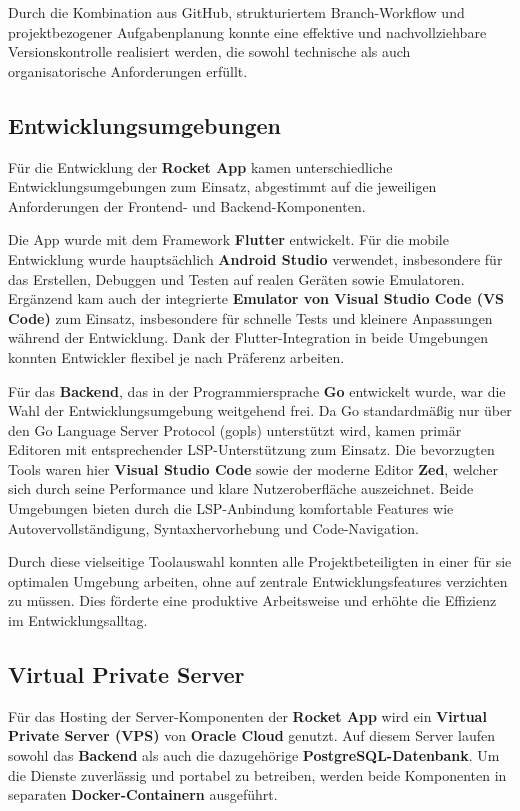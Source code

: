 \documentclass[11pt,a4paper]{article}
\begin{document}
Durch die Kombination aus GitHub, strukturiertem Branch-Workflow und projektbezogener Aufgabenplanung konnte eine effektive und nachvollziehbare Versionskontrolle realisiert werden, die sowohl technische als auch organisatorische Anforderungen erfüllt.

\subsection{Entwicklungsumgebungen}

Für die Entwicklung der \textbf{Rocket App} kamen unterschiedliche Entwicklungsumgebungen zum Einsatz, abgestimmt auf die jeweiligen Anforderungen der Frontend- und Backend-Komponenten.

Die App wurde mit dem Framework \textbf{Flutter}\cite{flutter} entwickelt. Für die mobile Entwicklung wurde hauptsächlich \textbf{Android Studio}\cite{androidstudio} verwendet, insbesondere für das Erstellen, Debuggen und Testen auf realen Geräten sowie Emulatoren. Ergänzend kam auch der integrierte \textbf{Emulator von Visual Studio Code (VS Code)}\cite{VSCode} zum Einsatz, insbesondere für schnelle Tests und kleinere Anpassungen während der Entwicklung. Dank der Flutter-Integration in beide Umgebungen konnten Entwickler flexibel je nach Präferenz arbeiten.

Für das \textbf{Backend}, das in der Programmiersprache \textbf{Go}\cite{golang} entwickelt wurde, war die Wahl der Entwicklungsumgebung weitgehend frei. Da Go standardmäßig nur über den Go Language Server Protocol (gopls)\cite{gopls} unterstützt wird, kamen primär Editoren mit entsprechender LSP-Unterstützung zum Einsatz. Die bevorzugten Tools waren hier \textbf{Visual Studio Code} sowie der moderne Editor \textbf{Zed}\cite{zed}, welcher sich durch seine Performance und klare Nutzeroberfläche auszeichnet. Beide Umgebungen bieten durch die LSP-Anbindung komfortable Features wie Autovervollständigung, Syntaxhervorhebung und Code-Navigation.

Durch diese vielseitige Toolauswahl konnten alle Projektbeteiligten in einer für sie optimalen Umgebung arbeiten, ohne auf zentrale Entwicklungsfeatures verzichten zu müssen. Dies förderte eine produktive Arbeitsweise und erhöhte die Effizienz im Entwicklungsalltag.

\subsection{Virtual Private Server}

Für das Hosting der Server-Komponenten der \textbf{Rocket App} wird ein \textbf{Virtual Private Server (VPS)} von \textbf{Oracle Cloud} genutzt. Auf diesem Server laufen sowohl das \textbf{Backend} als auch die dazugehörige \textbf{PostgreSQL-Datenbank}\cite{postgresql}. Um die Dienste zuverlässig und portabel zu betreiben, werden beide Komponenten in separaten \textbf{Docker-Containern}\cite{docker} ausgeführt.
\end{document}
